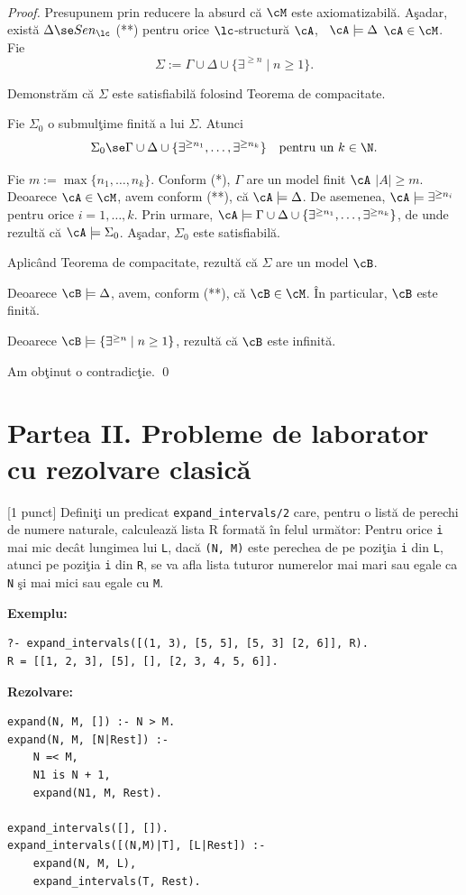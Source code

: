 \documentclass[12pt]{article}
\newcommand{\probex}{\stepcounter{uebno}{\vspace{0.3cm}\noindent \bf (P\arabic{uebno}) }}
\newcommand{\solution}[1]{$\,$ \\ \begin{proof}#1 \qed \end{proof}}
\begin{document}
\solution{Presupunem prin reducere la absurd c\u{a} $\cM$ este axiomatizabil\u{a}. A\c sadar, exist\u{a} $\Delta\se Sen_\lc$  \ai 
\bce
(**) \quad pentru orice $\lc$-structur\u{a} $\cA$, \, $\cA\models \Delta$ \ddacam $\cA\in \cM$.
\ece
Fie 
$$\Sigma:=\Gamma\cup \Delta \cup \{\exists^{\geq n}\mid n\geq 1\}.$$

Demonstr\u{a}m c\u{a} $\Sigma$ este satisfiabil\u{a} folosind Teorema de compacitate. 

Fie $\Sigma_0$ o submul\c{t}ime finit\u{a} a lui $\Sigma$. Atunci $$\Sigma_0\se \Gamma \cup \Delta \cup \{\exists^{\geq n_1},
\ldots, \exists^{\geq n_k}\} \quad \text{pentru un } k\in\N. $$

Fie $m:=\max\{n_1,\ldots, n_k\}$. Conform (*), $\Gamma$ are un model finit $\cA$ \ai $|A|\geq m$.  Deoarece $\cA\in \cM$, avem conform (**), c\u a  $\cA\models  \Delta$. 
De asemenea, $\cA\models \exists^{\geq n_i}$ pentru orice $i=1,\ldots, k$. 
Prin urmare, $\cA\models \Gamma \cup \Delta \cup  \{\exists^{\geq n_1},
\ldots, \exists^{\geq n_k}\}$, de unde rezult\u a c\u a $\cA\models \Sigma_0$. A\c sadar, $\Sigma_0$ este satisfiabil\u a.


Aplic\^{a}nd Teorema de compacitate, rezult\u{a} c\u{a}   $\Sigma$ are un model $\cB$. 

Deoarece $\cB\models \Delta$, avem, conform (**), c\u a $\cB\in \cM$. \^In particular,   $\cB$ este finit\u{a}. 

Deoarece $\cB\models \{\exists^{\geq n}\mid n\geq 1\}$,  rezult\u{a} c\u{a} $\cB$ este infinit\u{a}.
 
 Am ob\c{t}inut o contradic\c{t}ie. 
}

\section*{Partea II. Probleme de laborator cu rezolvare clasic\u{a}}
\probex[1 punct]
    Defini\c{t}i un predicat \texttt{expand\_intervals/2} care, pentru o list\u{a} de perechi de numere 
    naturale, calculeaz\u{a} lista R format\u{a} \^{i}n felul urm\u{a}tor:
    Pentru orice \texttt{i} mai mic dec\^{a}t lungimea lui \texttt{L},
    dac\u{a} \texttt{(N, M)} este perechea de pe pozi\c{t}ia \texttt{i} din \texttt{L},
    atunci pe pozi\c{t}ia \texttt{i} din \texttt{R},
    se va afla lista tuturor numerelor mai mari sau egale ca \texttt{N} \c{s}i mai mici sau egale 
    cu \texttt{M}.

    \textbf{Exemplu:}
\begin{verbatim}
?- expand_intervals([(1, 3), [5, 5], [5, 3] [2, 6]], R).
R = [[1, 2, 3], [5], [], [2, 3, 4, 5, 6]]. 
\end{verbatim}
\textbf{Rezolvare: }
\begin{verbatim}
expand(N, M, []) :- N > M.
expand(N, M, [N|Rest]) :-
    N =< M,
    N1 is N + 1,
    expand(N1, M, Rest).

expand_intervals([], []).
expand_intervals([(N,M)|T], [L|Rest]) :-
    expand(N, M, L),
    expand_intervals(T, Rest).
\end{verbatim}
\end{document}
